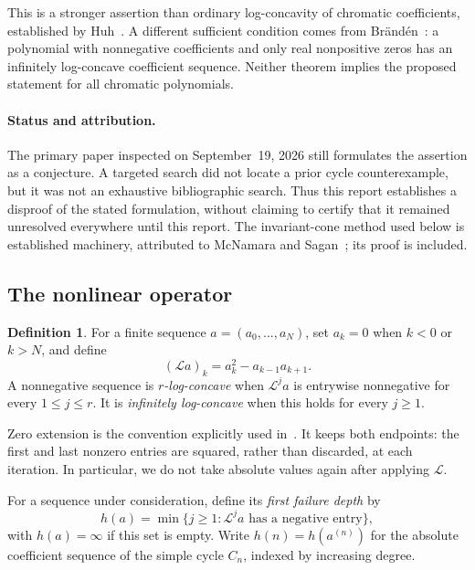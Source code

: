 \documentclass[11pt,a4paper]{article}
\theoremstyle{definition}
\newtheorem{definition}[theorem]{Definition}
\newcommand{\Lop}{\mathcal L}
\newcommand{\aco}{a^{(n)}}
\begin{document}
This is a stronger assertion than ordinary log-concavity of chromatic
coefficients, established by Huh~\cite{Huh}. A different sufficient
condition comes from Br\"and\'en~\cite{Branden}: a polynomial with
nonnegative coefficients and only real nonpositive zeros has an infinitely
log-concave coefficient sequence. Neither theorem implies the proposed
statement for all chromatic polynomials.

\paragraph{Status and attribution.}
The primary paper inspected on September~19, 2026 still formulates the
assertion as a conjecture. A targeted search did not locate a prior cycle
counterexample, but it was not an exhaustive bibliographic search. Thus
this report establishes a disproof of the stated formulation, without
claiming to certify that it remained unresolved everywhere until this
report. The invariant-cone method used below is established machinery,
attributed to McNamara and Sagan~\cite{MS}; its proof is included.

\subsection{The nonlinear operator}
\begin{definition}
For a finite sequence $a=(a_0,\ldots,a_N)$, set $a_k=0$ when $k<0$ or
$k>N$, and define
\begin{equation}\label{eq:L}
  (\Lop a)_k=a_k^2-a_{k-1}a_{k+1}.
\end{equation}
A nonnegative sequence is \emph{$r$-log-concave} when $\Lop^j a$ is
entrywise nonnegative for every $1\le j\le r$. It is
\emph{infinitely log-concave} when this holds for every $j\ge1$.
\end{definition}
Zero extension is the convention explicitly used in~\cite{MS}. It keeps
both endpoints: the first and last nonzero entries are squared, rather
than discarded, at each iteration. In particular, we do not take absolute
values again after applying $\Lop$.

For a sequence under consideration, define its \emph{first failure depth}
by
\begin{equation}\label{eq:depth}
  h(a)=\min\{j\ge1:\text{$\Lop^j a$ has a negative entry}\},
\end{equation}
with $h(a)=\infty$ if this set is empty. Write $h(n)=h(\aco)$ for the
absolute coefficient sequence of the simple cycle $C_n$, indexed by
increasing degree.
\end{document}
